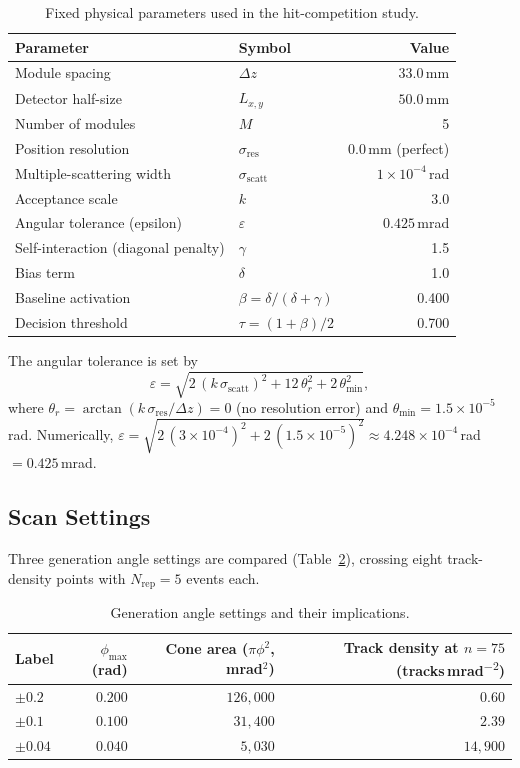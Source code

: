 \documentclass[12pt,a4paper]{article}
\newcommand{\eps}{\varepsilon}
\newcommand{\baseline}{\beta}  %
\newcommand{\thr}{\tau}        %
\begin{document}
\begin{table}[h!]
  \centering
  \caption{Fixed physical parameters used in the hit-competition study.}
  \label{tab:params}
  \begin{tabular}{llr}
    \toprule
    Parameter & Symbol & Value \\
    \midrule
    Module spacing & $\Delta z$ & $33.0$\,mm \\
    Detector half-size & $L_{x,y}$ & $50.0$\,mm \\
    Number of modules & $M$ & 5 \\
    Position resolution & $\sigma_\text{res}$ & $0.0$\,mm (perfect) \\
    Multiple-scattering width & $\sigma_\text{scatt}$ & $1\times10^{-4}$\,rad \\
    Acceptance scale & $k$ & 3.0 \\
    Angular tolerance (epsilon) & $\eps$ & $0.425$\,mrad \\
    Self-interaction (diagonal penalty) & $\gamma$ & 1.5 \\
    Bias term & $\delta$ & 1.0 \\
    Baseline activation & $\baseline = \delta/(\delta+\gamma)$ & 0.400 \\
    Decision threshold & $\thr = (1+\baseline)/2$ & 0.700 \\
    \bottomrule
  \end{tabular}
\end{table}

\noindent The angular tolerance is set by
\begin{equation}
  \eps = \sqrt{2\,(k\,\sigma_\text{scatt})^2 + 12\,\theta_r^2 + 2\,\theta_\text{min}^2},
  \label{eq:epsilon}
\end{equation}
where $\theta_r = \arctan(k\,\sigma_\text{res}/\Delta z) = 0$ (no resolution
error) and $\theta_\text{min}=1.5\times10^{-5}$\,rad.
Numerically, $\eps = \sqrt{2\,(3\times10^{-4})^2 + 2\,(1.5\times10^{-5})^2}
\approx 4.248\times10^{-4}$\,rad $= 0.425$\,mrad.

\subsection{Scan Settings}
\label{sec:scan}

Three generation angle settings are compared (Table~\ref{tab:scan}), crossing
eight track-density points with $N_\text{rep}=5$ events each.

\begin{table}[h!]
  \centering
  \caption{Generation angle settings and their implications.}
  \label{tab:scan}
  \begin{tabular}{lrrr}
    \toprule
    Label & $\phi_\text{max}$ (rad) & Cone area ($\pi\phi^2$, mrad$^2$) &
    Track density at $n=75$ (tracks\,mrad\textsuperscript{$-2$}) \\
    \midrule
    $\pm0.2$ & $0.200$ & $126{,}000$ & $0.60$ \\
    $\pm0.1$ & $0.100$ & $31{,}400$ & $2.39$ \\
    $\pm0.04$ & $0.040$ & $5{,}030$ & $14{,}900$ \\
    \bottomrule
  \end{tabular}
\end{table}
\end{document}
